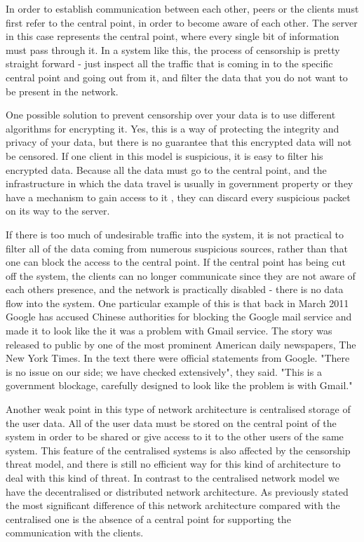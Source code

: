 In order to establish communication between each other, peers or the clients must first refer to the central point, in order to become aware of each other.
The server in this case represents the central point, where every single bit of information must pass through it.
In a system like this, the process of censorship is pretty straight forward - just inspect all the traffic that is coming in to the specific central point and going out from it, and filter the data that you do not want to be present in the network. 

One possible solution to prevent censorship over your data is to use different algorithms for encrypting it.
Yes, this is a way of protecting the integrity and privacy of your data, but there is no guarantee that this encrypted data will not be censored.
If one client in this model is suspicious, it is easy to filter his encrypted data.
Because all the data must go to the central point, and the infrastructure in which the data travel is usually in government property or they have a mechanism to gain access to it \cite{dianotti2011}, they can discard every suspicious packet on its way to the server.

If there is too much of undesirable traffic into the system, it is not practical to filter all of the data coming from numerous suspicious sources, rather than that one can block the access to the central point.
If the central point has being cut off the system, the clients can no longer communicate since they are not aware of each others presence, and the network is practically disabled - there is no data flow into the system.
One particular example of this is that back in March 2011 Google has accused Chinese authorities for blocking the Google mail service and made it to look like the it was a problem with Gmail service.
The story was released to public by one of the most prominent American daily newspapers, The New York Times.
In the text there were official statements from Google.
"There is no issue on our side; we have checked extensively", they said.
"This is a government blockage, carefully designed to look like the problem is with Gmail." \cite{web:newyorktimes}

Another weak point in this type of network architecture is centralised storage of the user data.
All of the user data must be stored on the central point of the system in order to be shared or give access to it to the other users of the same system.
This feature of the centralised systems is also affected by the censorship threat model, and there is still no efficient way for this kind of architecture to deal with this kind of threat.
In contrast to the centralised network model we have the decentralised or distributed network architecture.
As previously stated the most significant difference of this network architecture compared with the centralised one is the absence of a central point for supporting the communication with the clients. 

